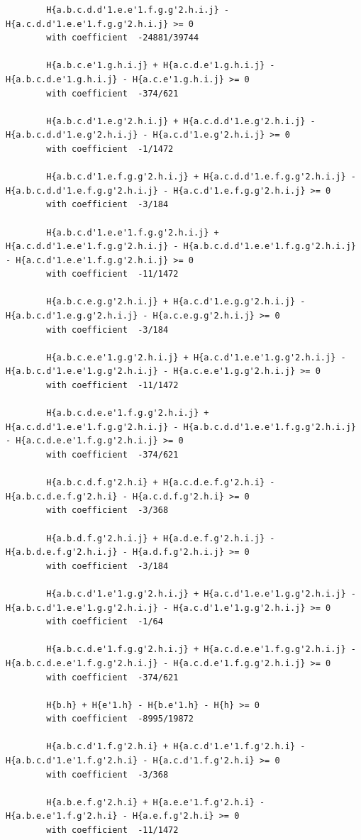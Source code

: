 \documentclass[11pt, a4paper]{kybernetika}
\begin{document}
\begin{verbatim}
		H{a.b.c.d.d'1.e.e'1.f.g.g'2.h.i.j} - H{a.c.d.d'1.e.e'1.f.g.g'2.h.i.j} >= 0
		with coefficient  -24881/39744
		
		H{a.b.c.e'1.g.h.i.j} + H{a.c.d.e'1.g.h.i.j} - H{a.b.c.d.e'1.g.h.i.j} - H{a.c.e'1.g.h.i.j} >= 0
		with coefficient  -374/621
		
		H{a.b.c.d'1.e.g'2.h.i.j} + H{a.c.d.d'1.e.g'2.h.i.j} - H{a.b.c.d.d'1.e.g'2.h.i.j} - H{a.c.d'1.e.g'2.h.i.j} >= 0
		with coefficient  -1/1472
		
		H{a.b.c.d'1.e.f.g.g'2.h.i.j} + H{a.c.d.d'1.e.f.g.g'2.h.i.j} - H{a.b.c.d.d'1.e.f.g.g'2.h.i.j} - H{a.c.d'1.e.f.g.g'2.h.i.j} >= 0
		with coefficient  -3/184
		
		H{a.b.c.d'1.e.e'1.f.g.g'2.h.i.j} + H{a.c.d.d'1.e.e'1.f.g.g'2.h.i.j} - H{a.b.c.d.d'1.e.e'1.f.g.g'2.h.i.j} - H{a.c.d'1.e.e'1.f.g.g'2.h.i.j} >= 0
		with coefficient  -11/1472
		
		H{a.b.c.e.g.g'2.h.i.j} + H{a.c.d'1.e.g.g'2.h.i.j} - H{a.b.c.d'1.e.g.g'2.h.i.j} - H{a.c.e.g.g'2.h.i.j} >= 0
		with coefficient  -3/184
		
		H{a.b.c.e.e'1.g.g'2.h.i.j} + H{a.c.d'1.e.e'1.g.g'2.h.i.j} - H{a.b.c.d'1.e.e'1.g.g'2.h.i.j} - H{a.c.e.e'1.g.g'2.h.i.j} >= 0
		with coefficient  -11/1472
		
		H{a.b.c.d.e.e'1.f.g.g'2.h.i.j} + H{a.c.d.d'1.e.e'1.f.g.g'2.h.i.j} - H{a.b.c.d.d'1.e.e'1.f.g.g'2.h.i.j} - H{a.c.d.e.e'1.f.g.g'2.h.i.j} >= 0
		with coefficient  -374/621
		
		H{a.b.c.d.f.g'2.h.i} + H{a.c.d.e.f.g'2.h.i} - H{a.b.c.d.e.f.g'2.h.i} - H{a.c.d.f.g'2.h.i} >= 0
		with coefficient  -3/368
		
		H{a.b.d.f.g'2.h.i.j} + H{a.d.e.f.g'2.h.i.j} - H{a.b.d.e.f.g'2.h.i.j} - H{a.d.f.g'2.h.i.j} >= 0
		with coefficient  -3/184
		
		H{a.b.c.d'1.e'1.g.g'2.h.i.j} + H{a.c.d'1.e.e'1.g.g'2.h.i.j} - H{a.b.c.d'1.e.e'1.g.g'2.h.i.j} - H{a.c.d'1.e'1.g.g'2.h.i.j} >= 0
		with coefficient  -1/64
		
		H{a.b.c.d.e'1.f.g.g'2.h.i.j} + H{a.c.d.e.e'1.f.g.g'2.h.i.j} - H{a.b.c.d.e.e'1.f.g.g'2.h.i.j} - H{a.c.d.e'1.f.g.g'2.h.i.j} >= 0
		with coefficient  -374/621
		
		H{b.h} + H{e'1.h} - H{b.e'1.h} - H{h} >= 0
		with coefficient  -8995/19872
		
		H{a.b.c.d'1.f.g'2.h.i} + H{a.c.d'1.e'1.f.g'2.h.i} - H{a.b.c.d'1.e'1.f.g'2.h.i} - H{a.c.d'1.f.g'2.h.i} >= 0
		with coefficient  -3/368
		
		H{a.b.e.f.g'2.h.i} + H{a.e.e'1.f.g'2.h.i} - H{a.b.e.e'1.f.g'2.h.i} - H{a.e.f.g'2.h.i} >= 0
		with coefficient  -11/1472
		

\end{verbatim}
\end{document}
